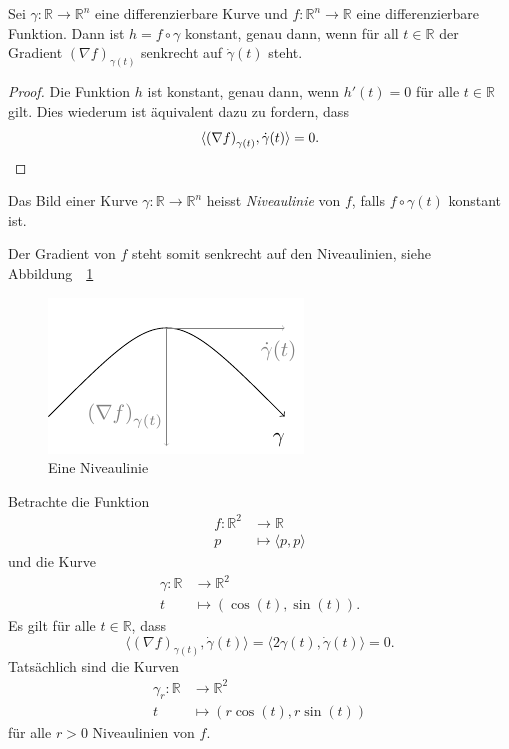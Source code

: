 \documentclass[../main.tex]{subfiles}
\begin{document}
\begin{proposition*}
  Sei $\gamma \colon \mathbb{R} \to \mathbb{R}^n$ 
  eine differenzierbare Kurve und 
  $f \colon \mathbb{R}^n \to \mathbb{R}$ eine
  differenzierbare Funktion.
  Dann ist $h = f \circ \gamma$ konstant, genau dann,
  wenn für all $t \in \mathbb{R}$ 
  der Gradient ${(\nabla f)}_{\gamma(t)}$ senkrecht auf
  $\dot \gamma(t)$ steht.
\end{proposition*}

\begin{proof}
  Die Funktion $h$ ist konstant, genau dann,
  wenn $h'(t) = 0$ für alle $t \in \mathbb{R}$ gilt.
  Dies wiederum ist äquivalent dazu zu fordern, dass
  \[
    \langle {(\nabla f)}_{\gamma(t)}, \dot \gamma(t) \rangle = 0.
    \qedhere
  \]
\end{proof}

\begin{definition}
  Das Bild einer Kurve $\gamma \colon \mathbb{R} \to \mathbb{R}^n$ 
  heisst \emph{Niveaulinie} von $f$,
  falls $f \circ \gamma(t)$ konstant ist.
\end{definition}

Der Gradient von $f$ steht somit senkrecht auf den Niveaulinien, siehe Abbildung~~\ref{fig:niveau}

\begin{figure}[htb]
  \centering
  \includegraphics{figures/niveau}
  \caption{Eine Niveaulinie}%
  \label{fig:niveau}
\end{figure}

\begin{example}
  Betrachte die Funktion
  \begin{align*}
    f \colon \mathbb{R}^2 & \to \mathbb{R} \\
    p & \mapsto \langle p, p \rangle
  \end{align*}
  und die Kurve
  \begin{align*}
    \gamma \colon \mathbb{R} & \to \mathbb{R}^2 \\
    t & \mapsto (\cos(t), \sin(t)).
  \end{align*}
  Es gilt für alle $t \in \mathbb{R}$,
  dass
  \[
  \langle {(\nabla f)}_{\gamma(t)}, \dot \gamma(t) \rangle
  = \langle 2 \gamma(t), \dot \gamma(t) \rangle = 0.
  \]
  Tatsächlich sind die Kurven
  \begin{align*}
    \gamma_r \colon \mathbb{R} & \to \mathbb{R}^2 \\
    t & \mapsto (r\cos(t), r\sin(t))
  \end{align*}
  für alle $r > 0$ Niveaulinien von $f$.
\end{example}
\end{document}
